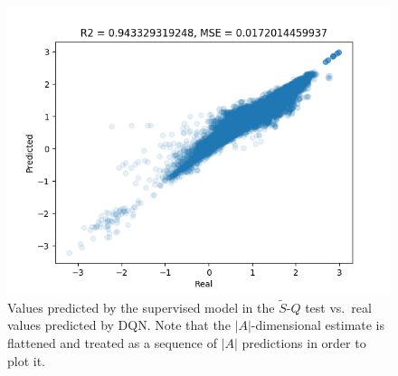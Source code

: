 %
%
\begin{figure}
    \includegraphics[width=\textwidth]{pictures/experiments/FQ_test_pong}
    \centering
    \caption[Predictions of $\tilde{S}$-$Q$ mapping experiment]{Values predicted 
	     by the supervised model in the $\tilde{S}$-$Q$ test vs.\ real values
	     predicted by DQN. Note that the $|A|$-dimensional estimate is 
	     flattened and treated as a sequence of $|A|$ predictions in order to
	     plot it.}
    \label{f:FQ_test_space_invaders}
\end{figure}
%

